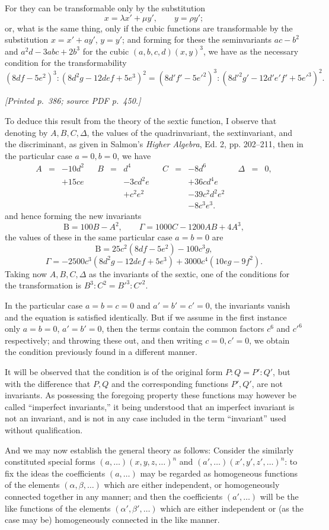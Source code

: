 \documentclass[11pt,a4paper]{article}
\newcommand{\sourcepage}[2]{\par\smallskip\noindent\textit{[Printed p.~#1; source PDF p.~#2.]}\par\smallskip}
\begin{document}
For they can be transformable only by the substitution
\[
x=\lambda x'+\mu y',\qquad y=\rho y';
\]
or, what is the same thing, only if the cubic functions are transformable by the
substitution $x=x'+ay'$, $y=y'$; and forming for these the seminvariants
$ac-b^2$ and $a^2d-3abc+2b^3$ for the cubic $(a,b,c,d)(x,y)^3$, we have as the
necessary condition for the transformability
\[
(8df-5e^2)^3:(8d^2g-12def+5e^3)^2
=(8d'f'-5e'^2)^3:(8d'^2g'-12d'e'f'+5e'^3)^2.
\]

\sourcepage{386}{450}
To deduce this result from the theory of the sextic function, I observe that denoting
by $A,B,C,\Delta$, the values of the quadrinvariant, the sextinvariant, and the
discriminant, as given in Salmon's \textit{Higher Algebra}, Ed. 2, pp. 202--211, then in the
particular case $a=0,b=0$, we have
\[
\begin{array}{rclcrclcrclcrcl}
A&=&-10d^2&&B&=&d^4&&C&=&-8d^6&&\Delta&=&0,\\
 &&+15ce&& &&-3cd^2e&& &&+36cd^4e&&&&\\
 &&&& &&+c^2e^2&& &&-39c^2d^2e^2&&&&\\
 &&&& &&&& &&-8c^3e^3.&&&
\end{array}
\]
and hence forming the new invariants
\[
\mathrm B=100B-A^2,\qquad
\Gamma=1000C-1200AB+4A^3,
\]
the values of these in the same particular case $a=b=0$ are
\[
\mathrm B=25c^2(8df-5e^2)-100c^3g,
\]
\[
\Gamma=-2500c^3(8d^2g-12def+5e^3)+3000c^4(10eg-9f^2).
\]
Taking now $A,B,C,\Delta$ as the invariants of the sextic, one of the conditions
for the transformation is $B^3:C^2=B'^3:C'^2$.

In the particular case $a=b=c=0$ and $a'=b'=c'=0$, the invariants vanish and the
equation is satisfied identically. But if we assume in the first instance only
$a=b=0$, $a'=b'=0$, then the terms contain the common factors $c^6$ and $c'^6$
respectively; and throwing these out, and then writing $c=0,c'=0$, we obtain the
condition previously found in a different manner.

It will be observed that the condition is of the original form $P:Q=P':Q'$, but
with the difference that $P,Q$ and the corresponding functions $P',Q'$, are not
invariants. As possessing the foregoing property these functions may however be
called ``imperfect invariants,'' it being understood that an imperfect invariant is not
an invariant, and is not in any case included in the term ``invariant'' used without
qualification.

And we may now establish the general theory as follows: Consider the similarly
constituted special forms $(a,\ldots)(x,y,z,\ldots)^n$ and
$(a',\ldots)(x',y',z',\ldots)^n$: to fix the ideas the coefficients $(a,\ldots)$ may
be regarded as homogeneous functions of the elements $(\alpha,\beta,\ldots)$ which
are either independent, or homogeneously connected together in any manner; and then
the coefficients $(a',\ldots)$ will be the like functions of the elements
$(\alpha',\beta',\ldots)$ which are either independent or (as the case may be)
homogeneously connected in the like manner.
\end{document}
